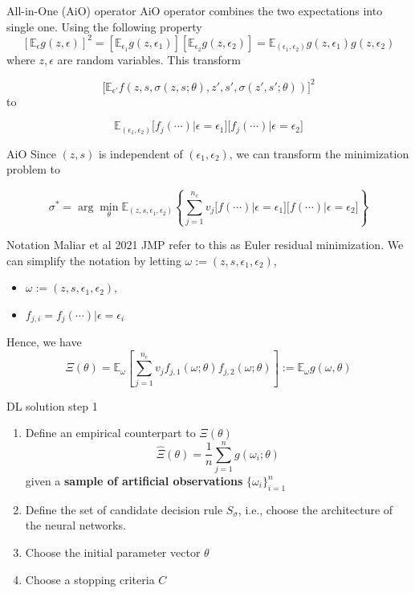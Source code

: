 \documentclass[aspectratio=169]{beamer} %
\begin{document}
\begin{frame}{All-in-One (AiO) operator}
AiO operator combines the two expectations into single one. Using the following property
$$
[\mathbb{E}_{\epsilon} g(z,\epsilon)]^2 = [\mathbb{E}_{\epsilon_1} g(z,\epsilon_1)][\mathbb{E}_{\epsilon_2} g(z,\epsilon_2)] = \mathbb{E}_{(\epsilon_1, \epsilon_2)} g(z,\epsilon_1)g(z,\epsilon_2)
$$
where $z,\epsilon$ are random variables.  This transform 

    $$
    \bigg[\mathbb{E}_{\epsilon'} f(z,s,\sigma(z,s;\theta), z',s',\sigma(z',s';\theta))\bigg]^2
    $$
to

$$
\mathbb{E}_{(\epsilon_1, \epsilon_2)} \bigg[f_j(\cdots)\bigg|\epsilon = \epsilon_1\bigg] \bigg[f_j(\cdots)\bigg|\epsilon = \epsilon_2\bigg]
$$
\end{frame}

\begin{frame}{AiO}
    Since $(z,s)$ is independent of $(\epsilon_1,\epsilon_2)$, we can transform the minimization problem to

    $$
    \sigma^* = \arg\min_\theta \mathbb{E}_{(z,s,\epsilon_1,\epsilon_2)}\left\{\sum_{j=1}^{n_c} v_j \bigg[f(\cdots)\bigg|\epsilon = \epsilon_1\bigg]\bigg[f(\cdots)\bigg|\epsilon = \epsilon_2\bigg]\right\}
    $$

\end{frame}

\begin{frame}{Notation}
    Maliar et al 2021 JMP refer to this as Euler residual minimization. We can simplify the notation by letting $\omega:= (z,s,\epsilon_1, \epsilon_2)$, 
    \begin{itemize}
        \item $\omega:= (z,s,\epsilon_1, \epsilon_2)$, 
        \item $f_{j,i} = f_j(\cdots)|\epsilon= \epsilon_i$
    \end{itemize}
    Hence, we have
    $$
    \Xi(\theta) = \mathbb{E}_\omega\left[\sum_{j=1}^{n_c}v_j f_{j,1}(\omega;\theta)f_{j,2}(\omega;\theta)\right]:= \mathbb{E}_\omega g(\omega, \theta)
    $$
\end{frame}


\begin{frame}{DL solution step 1}
\begin{enumerate}
    \item Define an empirical counterpart to $\Xi(\theta)$
    $$
    \widehat{\Xi}(\theta) = \frac{1}{n}\sum_{j=1}^n g(\omega_i;\theta)
    $$
    given a \textbf{sample of artificial observations} $\{\omega_i\}_{i=1}^n$
    \item Define the set of candidate decision rule $S_\sigma$, i.e., choose the architecture of the neural networks. 
    \item Choose the initial parameter vector $\theta$
    \item Choose a stopping criteria $C$
\end{enumerate}
    
\end{frame}
\end{document}
